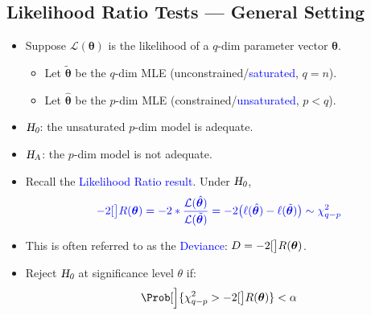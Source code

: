 \documentclass[oneside]{book}\usepackage[]{graphicx}\usepackage[svgnames]{xcolor}
\let\log\relax%
\newcommand{\HN}{\textsl{H}_{\textsl{0}}}%
\newcommand{\HA}{\textsl{H}_{\textsl{A}}}%
\providecommand{\Vector}[1]{\bm{#1}}%
\begin{document}
\subsection*{Likelihood Ratio Tests --- General Setting}
\begin{itemize}
      \item Suppose $ \mathcal{L}(\Vector{\theta}) $ is the likelihood of a $ q $-dim parameter vector $ \Vector{\theta} $.
            \begin{itemize}
                  \item Let $ \tilde{\Vector{\theta}} $ be the $ q $-dim MLE (unconstrained/\textcolor{Blue}{saturated}, $ q=n $).
                  \item Let $ \hat{\Vector{\theta}} $ be the $ p $-dim MLE (constrained/\textcolor{Blue}{unsaturated}, $ p<q $).
            \end{itemize}
      \item $ \HN $: the unsaturated $ p $-dim model is adequate.
      \item $ \HA $: the $ p $-dim model is not adequate.
      \item Recall the \textcolor{Blue}{Likelihood Ratio result}. Under $ \HN $,
            \[ \textcolor{Blue}{-2\log[\big]{R(\Vector{\theta})}=-2\log*{\frac{\mathcal{L}(\hat{\Vector{\theta}})}{\mathcal{L}(\tilde{\Vector{\theta}})}}=-2\bigl(\ell(\hat{\Vector{\theta}})-\ell(\tilde{\Vector{\theta}})\bigr) \sim \chi^2_{q-p}} \]
      \item This is often referred to as the \textcolor{Blue}{Deviance}: $ D=-2\log[\big]{R(\Vector{\theta})} $.
      \item Reject $ \HN $ at significance level $ \theta $ if:
            \[ \Prob[\Big]{\chi^2_{q-p}>-2\log[\big]{R(\Vector{\theta})}}<\alpha \]
\end{itemize}
\end{document}
